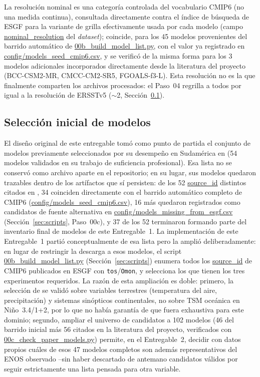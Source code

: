 \documentclass[11pt,a4paper]{article}
\newcommand{\archivo}[1]{\begingroup\hypersetup{urlcolor=black}\url{#1}\endgroup}
\begin{document}
La resoluci\'on nominal es una categor\'ia controlada del vocabulario CMIP6 (no una medida continua), consultada directamente contra el \'indice de b\'usqueda de ESGF para la variante de grilla efectivamente usada por cada modelo (campo \archivo{nominal_resolution} del \emph{dataset}); coincide, para los 45 modelos provenientes del barrido autom\'atico de \archivo{00b_build_model_list.py}, con el valor ya registrado en \archivo{config/models_seed_cmip6.csv}, y se verific\'o de la misma forma para los 3 modelos adicionales incorporados directamente desde la literatura del proyecto (BCC-CSM2-MR, CMCC-CM2-SR5, FGOALS-f3-L).
Esta resoluci\'on no es la que finalmente comparten los archivos procesados: el Paso~04 regrilla a todos por igual a la resoluci\'on de ERSSTv5 ($\sim$2\textdegree, Secci\'on~\ref{sec:desviacion}).

\subsection{Selecci\'on inicial de modelos}
\label{sec:desviacion}

El dise\~no original de este entregable tom\'o como punto de partida el conjunto de modelos previamente seleccionados por su desempe\~no en Sudam\'erica en \citet{bruno2023} (54 modelos validados en su trabajo de suficiencia profesional). Esa lista no se conserv\'o como archivo aparte en el repositorio; en su lugar, sus modelos quedaron trazables dentro de los art\'ifactos que s\'i persisten: de los 52 \archivo{source_id} distintos citados en \citet{bruno2023}, 34 coinciden directamente con el barrido autom\'atico completo de CMIP6 (\archivo{config/models_seed_cmip6.csv}), 16 m\'as quedaron registrados como candidatos de fuente alternativa en \archivo{config/models_missing_from_esgf.csv} (Secci\'on~\ref{sec:scripts}, Paso~00c), y 37 de los 52 terminaron formando parte del inventario final de modelos de este Entregable~1. La implementaci\'on de este Entregable~1 parti\'o conceptualmente de esa lista pero la ampli\'o deliberadamente: en lugar de restringir la descarga a esos modelos, el script \archivo{00b_build_model_list.py} (Secci\'on~\ref{sec:scripts}) enumera todos los \archivo{source_id} de CMIP6 publicados en ESGF con \texttt{tos}/\texttt{Omon}, y selecciona los que tienen los tres experimentos requeridos. La raz\'on de esta ampliaci\'on es doble: primero, la selecci\'on de \citet{bruno2023} se valid\'o sobre variables terrestres (temperatura del aire, precipitaci\'on) y sistemas sin\'opticos continentales, no sobre TSM oce\'anica en Ni\~no~3.4/1+2, por lo que no hab\'ia garant\'ia de que fuera exhaustiva para este dominio; segundo, ampliar el universo de candidatos a 102 modelos (46 del barrido inicial m\'as 56 citados en la literatura del proyecto, verificados con \archivo{00c_check_paper_models.py}) permite, en el Entregable~2, decidir con datos propios cu\'ales de esos 47 modelos completos son adem\'as representativos del ENOS observado --sin haber descartado de antemano candidatos v\'alidos por seguir estrictamente una lista pensada para otra variable.
\end{document}
